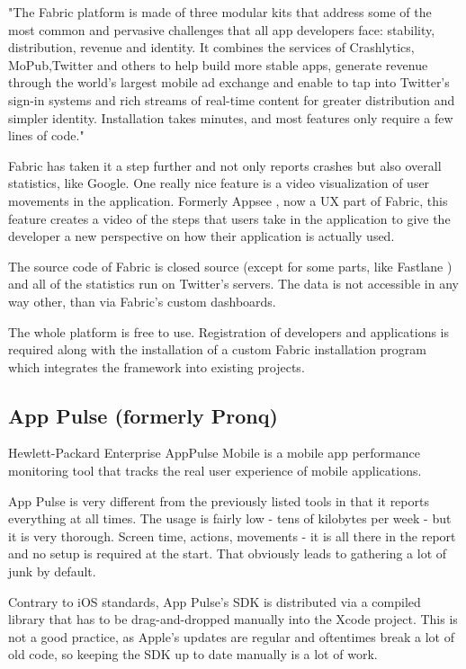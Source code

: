 \bigbreak

"The Fabric platform is made of three modular kits that address some of the most common and pervasive challenges that all app developers face: stability, distribution, revenue and identity. It combines the services of Crashlytics, MoPub,Twitter and others to help build more stable apps, generate revenue through the world’s largest mobile ad exchange and enable to tap into Twitter’s sign-in systems and rich streams of real-time content for greater distribution and simpler identity. Installation takes minutes, and most features only require a few lines of code." \cite{fabric}

\bigbreak

Fabric has taken it a step further and not only reports crashes but also overall statistics, like Google. One really nice feature is a video visualization of user movements in the application. Formerly Appsee \cite{appsee}, now a UX part of Fabric, this feature creates a video of the steps that users take in the application to give the developer a new perspective on how their application is actually used.

The source code of Fabric is closed source (except for some parts, like Fastlane \cite{fastlane}) and all of the statistics run on Twitter's servers. The data is not accessible in any way other, than via Fabric's custom dashboards. 

The whole platform is free to use. Registration of developers and applications is required along with the installation of a custom Fabric installation program which integrates the framework into existing projects.

\subsection{App Pulse (formerly Pronq)}

Hewlett-Packard Enterprise AppPulse Mobile is a mobile app performance monitoring tool that tracks the real user experience of mobile applications.

App Pulse is very different from the previously listed tools in that it reports everything at all times. The usage is fairly low - tens of kilobytes per week - but it is very thorough. Screen time, actions, movements - it is all there in the report and no setup is required at the start. That obviously leads to gathering a lot of junk by default.

Contrary to iOS standards, App Pulse's SDK is distributed via a compiled library that has to be drag-and-dropped manually into the Xcode project. This is not a good practice, as Apple's updates are regular and oftentimes break a lot of old code, so keeping the SDK up to date manually is a lot of work.


